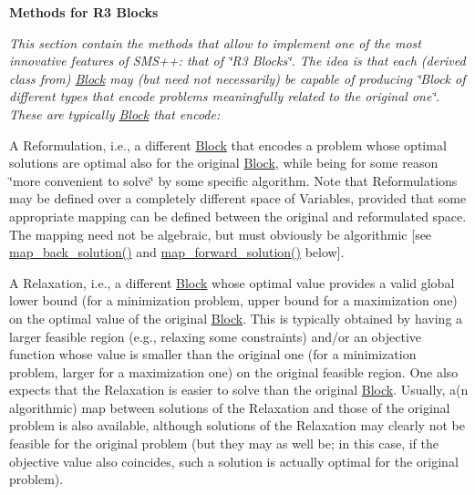 \begin{Indent}\textbf{ Methods for R3 Blocks}\par
{\em This section contain the methods that allow to implement one of the most innovative features of S\+M\+S++\+: that of \char`\"{}\+R3 Blocks\char`\"{}. The idea is that each (derived class from) \mbox{\hyperlink{class_s_m_spp__di__unipi__it_1_1_block}{Block}} may (but need not necessarily) be capable of producing \char`\"{}\+Block of different types that encode problems meaningfully
related to the original one\char`\"{}. These are typically \mbox{\hyperlink{class_s_m_spp__di__unipi__it_1_1_block}{Block}} that encode\+:


\begin{DoxyItemize}
\item A Reformulation, i.\+e., a different \mbox{\hyperlink{class_s_m_spp__di__unipi__it_1_1_block}{Block}} that encodes a problem whose optimal solutions are optimal also for the original \mbox{\hyperlink{class_s_m_spp__di__unipi__it_1_1_block}{Block}}, while being for some reason \char`\"{}more convenient to solve\char`\"{} by some specific algorithm. Note that Reformulations may be defined over a completely different space of Variables, provided that some appropriate mapping can be defined between the original and reformulated space. The mapping need not be algebraic, but must obviously be algorithmic \mbox{[}see \mbox{\hyperlink{class_s_m_spp__di__unipi__it_1_1_block_a04f0a8a608fcc3ded227c2552f67f1a3}{map\+\_\+back\+\_\+solution()}} and \mbox{\hyperlink{class_s_m_spp__di__unipi__it_1_1_block_a7759467d70613a10c1cdb5d3193b4434}{map\+\_\+forward\+\_\+solution()}} below\mbox{]}.
\item A Relaxation, i.\+e., a different \mbox{\hyperlink{class_s_m_spp__di__unipi__it_1_1_block}{Block}} whose optimal value provides a valid global lower bound (for a minimization problem, upper bound for a maximization one) on the optimal value of the original \mbox{\hyperlink{class_s_m_spp__di__unipi__it_1_1_block}{Block}}. This is typically obtained by having a larger feasible region (e.\+g., relaxing some constraints) and/or an objective function whose value is smaller than the original one (for a minimization problem, larger for a maximization one) on the original feasible region. One also expects that the Relaxation is easier to solve than the original \mbox{\hyperlink{class_s_m_spp__di__unipi__it_1_1_block}{Block}}. Usually, a(n algorithmic) map between solutions of the Relaxation and those of the original problem is also available, although solutions of the Relaxation may clearly not be feasible for the original problem (but they may as well be; in this case, if the objective value also coincides, such a solution is actually optimal for the original problem).

\end{DoxyItemize}}
\end{Indent}

